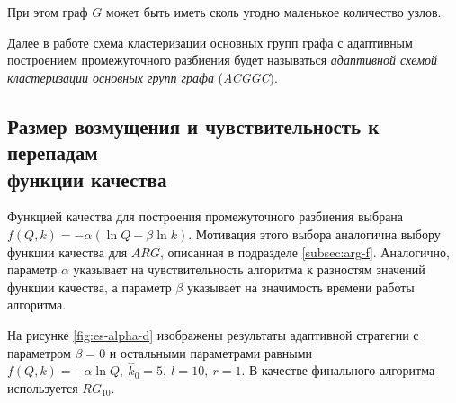 При этом граф $G$ может быть иметь сколь угодно маленькое количество узлов.

Далее в работе схема кластеризации основных групп графа с адаптивным построением промежуточного разбиения будет называться \emph{адаптивной схемой кластеризации основных групп графа} (\emph{ACGGC}).



\subsection[Размер возмущения и чувствительность к перепадам функции качества]{Размер возмущения и чувствительность к перепадам\\ функции качества}

Функцией качества для построения промежуточного разбиения выбрана $f(Q, k) = -\alpha(\ln Q - \beta \ln k)$. Мотивация этого выбора аналогична выбору функции качества для $ARG$, описанная в подразделе \ref{subsec:arg-f}. Аналогично, параметр $\alpha$ указывает на чувствительность алгоритма к разностям значений функции качества, а параметр $\beta$ указывает на значимость времени работы алгоритма.

На рисунке \ref{fig:es-alpha-d} изображены результаты адаптивной стратегии с параметром $\beta = 0$ и остальными параметрами равными $f(Q, k) = -\alpha \ln Q,\ \hat{k}_0 = 5,\ l = 10,\ r = 1$. В качестве финального алгоритма используется $RG_{10}$.

